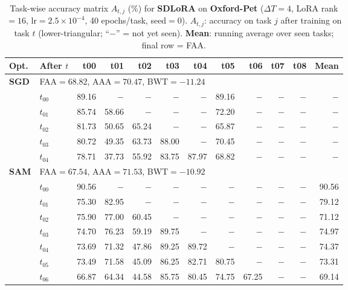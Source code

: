 \begin{table}[ht]
\centering
\caption{%
  Task-wise accuracy matrix $A_{t,j}$ (\%) for \textbf{SDLoRA} on \textbf{Oxford-Pet} ($\Delta T=4$, LoRA rank$=16$, lr$=2.5\times10^{-4}$, 40 epochs/task, seed$=0$).
  $A_{t,j}$: accuracy on task $j$ after training on task $t$  (lower-triangular; ``$-$'' = not yet seen).
  \textbf{Mean}: running average over seen tasks; final row = FAA.
}
\label{tab:raw_sdlora_pets}
\setlength{\tabcolsep}{2.8pt}
\renewcommand{\arraystretch}{0.88}
\scriptsize
\begin{tabular}{@{}l l r r r r r r r r r r@{}}
\toprule
\textbf{Opt.} & \textbf{After $t$} & \textbf{t00} & \textbf{t01} & \textbf{t02} & \textbf{t03} & \textbf{t04} & \textbf{t05} & \textbf{t06} & \textbf{t07} & \textbf{t08} & \textbf{Mean} \\
\midrule
\multirow{6}{*}{\textbf{SGD}} & \multicolumn{11}{l}{\quad\small FAA$=68.82$,\; AAA$=70.47$,\; BWT$=-11.24$} \\
 & $t_{00}$ & 89.16 & $-$ & $-$ & $-$ & $-$ & 89.16 & $-$ & $-$ & $-$ & $-$ \\
 & $t_{01}$ & 85.74 & 58.66 & $-$ & $-$ & $-$ & 72.20 & $-$ & $-$ & $-$ & $-$ \\
 & $t_{02}$ & 81.73 & 50.65 & 65.24 & $-$ & $-$ & 65.87 & $-$ & $-$ & $-$ & $-$ \\
 & $t_{03}$ & 80.72 & 49.35 & 63.73 & 88.00 & $-$ & 70.45 & $-$ & $-$ & $-$ & $-$ \\
 & $t_{04}$ & 78.71 & 37.73 & 55.92 & 83.75 & 87.97 & 68.82 & $-$ & $-$ & $-$ & $-$ \\
\midrule
\multirow{10}{*}{\textbf{SAM}} & \multicolumn{11}{l}{\quad\small FAA$=67.54$,\; AAA$=71.53$,\; BWT$=-10.92$} \\
 & $t_{00}$ & 90.56 & $-$ & $-$ & $-$ & $-$ & $-$ & $-$ & $-$ & $-$ & 90.56 \\
 & $t_{01}$ & 75.30 & 82.95 & $-$ & $-$ & $-$ & $-$ & $-$ & $-$ & $-$ & 79.12 \\
 & $t_{02}$ & 75.90 & 77.00 & 60.45 & $-$ & $-$ & $-$ & $-$ & $-$ & $-$ & 71.12 \\
 & $t_{03}$ & 74.70 & 76.23 & 59.19 & 89.75 & $-$ & $-$ & $-$ & $-$ & $-$ & 74.97 \\
 & $t_{04}$ & 73.69 & 71.32 & 47.86 & 89.25 & 89.72 & $-$ & $-$ & $-$ & $-$ & 74.37 \\
 & $t_{05}$ & 73.49 & 71.58 & 45.09 & 86.25 & 82.71 & 80.75 & $-$ & $-$ & $-$ & 73.31 \\
 & $t_{06}$ & 66.87 & 64.34 & 44.58 & 85.75 & 80.45 & 74.75 & 67.25 & $-$ & $-$ & 69.14 \\

\end{tabular}
\end{table}

